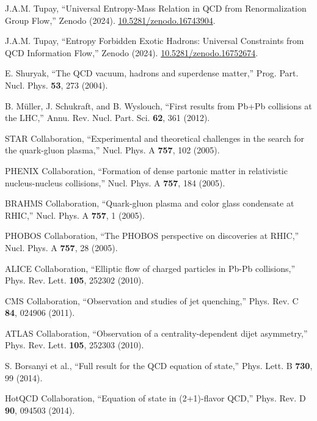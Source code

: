 \documentclass[12pt,a4paper]{article}
\begin{document}
\begin{thebibliography}{99}

J.A.M. Tupay, ``Universal Entropy-Mass Relation in QCD from Renormalization Group Flow,'' Zenodo (2024). \href{https://doi.org/10.5281/zenodo.16743904}{10.5281/zenodo.16743904}.

J.A.M. Tupay, ``Entropy Forbidden Exotic Hadrons: Universal Constraints from QCD Information Flow,'' Zenodo (2024). \href{https://doi.org/10.5281/zenodo.16752674}{10.5281/zenodo.16752674}.

E. Shuryak, ``The QCD vacuum, hadrons and superdense matter,'' Prog. Part. Nucl. Phys. \textbf{53}, 273 (2004).

B. Müller, J. Schukraft, and B. Wyslouch, ``First results from Pb+Pb collisions at the LHC,'' Annu. Rev. Nucl. Part. Sci. \textbf{62}, 361 (2012).

STAR Collaboration, ``Experimental and theoretical challenges in the search for the quark-gluon plasma,'' Nucl. Phys. A \textbf{757}, 102 (2005).

PHENIX Collaboration, ``Formation of dense partonic matter in relativistic nucleus-nucleus collisions,'' Nucl. Phys. A \textbf{757}, 184 (2005).

BRAHMS Collaboration, ``Quark-gluon plasma and color glass condensate at RHIC,'' Nucl. Phys. A \textbf{757}, 1 (2005).

PHOBOS Collaboration, ``The PHOBOS perspective on discoveries at RHIC,'' Nucl. Phys. A \textbf{757}, 28 (2005).

ALICE Collaboration, ``Elliptic flow of charged particles in Pb-Pb collisions,'' Phys. Rev. Lett. \textbf{105}, 252302 (2010).

CMS Collaboration, ``Observation and studies of jet quenching,'' Phys. Rev. C \textbf{84}, 024906 (2011).

ATLAS Collaboration, ``Observation of a centrality-dependent dijet asymmetry,'' Phys. Rev. Lett. \textbf{105}, 252303 (2010).

S. Borsanyi et al., ``Full result for the QCD equation of state,'' Phys. Lett. B \textbf{730}, 99 (2014).

HotQCD Collaboration, ``Equation of state in (2+1)-flavor QCD,'' Phys. Rev. D \textbf{90}, 094503 (2014).


\end{thebibliography}
\end{document}
